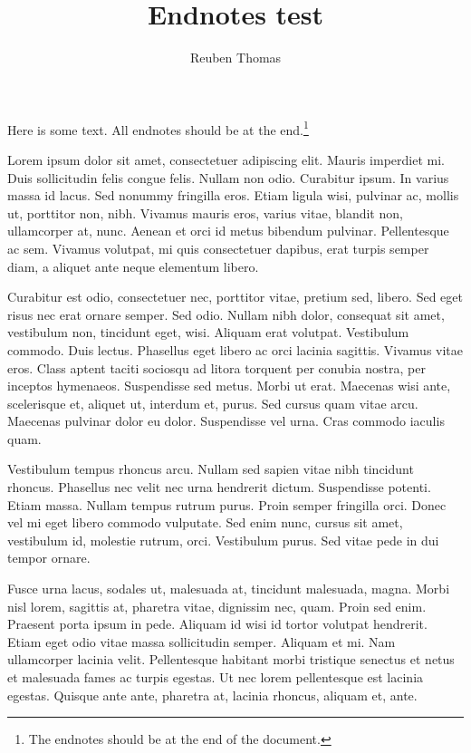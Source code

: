 ﻿\documentclass{article}
\begin{document}
\title{Endnotes test}
\author{Reuben Thomas}
\maketitle

Here is some text.
All endnotes should be at the end.\footnote{The endnotes should be at the
end of the document.}

Lorem ipsum dolor sit amet, consectetuer adipiscing elit. Mauris imperdiet mi.
Duis sollicitudin felis congue felis. Nullam non odio. Curabitur ipsum. In
varius massa id lacus. Sed nonummy fringilla eros. Etiam ligula wisi, pulvinar
ac, mollis ut, porttitor non, nibh. Vivamus mauris eros, varius vitae, blandit
non, ullamcorper at, nunc. Aenean et orci id metus bibendum pulvinar.
Pellentesque ac sem. Vivamus volutpat, mi quis consectetuer dapibus, erat turpis
semper diam, a aliquet ante neque elementum libero.

Curabitur est odio, consectetuer nec, porttitor vitae, pretium sed, libero. Sed
eget risus nec erat ornare semper. Sed odio. Nullam nibh dolor, consequat sit
amet, vestibulum non, tincidunt eget, wisi. Aliquam erat volutpat. Vestibulum
commodo. Duis lectus. Phasellus eget libero ac orci lacinia sagittis. Vivamus
vitae eros. Class aptent taciti sociosqu ad litora torquent per conubia nostra,
per inceptos hymenaeos. Suspendisse sed metus. Morbi ut erat. Maecenas wisi
ante, scelerisque et, aliquet ut, interdum et, purus. Sed cursus quam vitae
arcu. Maecenas pulvinar dolor eu dolor. Suspendisse vel urna. Cras commodo
iaculis quam.

Vestibulum tempus rhoncus arcu. Nullam sed sapien vitae nibh tincidunt rhoncus.
Phasellus nec velit nec urna hendrerit dictum. Suspendisse potenti. Etiam massa.
Nullam tempus rutrum purus. Proin semper fringilla orci. Donec vel mi eget
libero commodo vulputate. Sed enim nunc, cursus sit amet, vestibulum id,
molestie rutrum, orci. Vestibulum purus. Sed vitae pede in dui tempor ornare.

Fusce urna lacus, sodales ut, malesuada at, tincidunt malesuada, magna. Morbi
nisl lorem, sagittis at, pharetra vitae, dignissim nec, quam. Proin sed enim.
Praesent porta ipsum in pede. Aliquam id wisi id tortor volutpat hendrerit.
Etiam eget odio vitae massa sollicitudin semper. Aliquam et mi. Nam ullamcorper
lacinia velit. Pellentesque habitant morbi tristique senectus et netus et
malesuada fames ac turpis egestas. Ut nec lorem pellentesque est lacinia
egestas. Quisque ante ante, pharetra at, lacinia rhoncus, aliquam et, ante.
\end{document}
